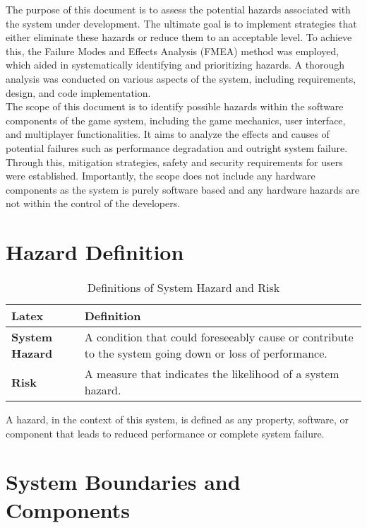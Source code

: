 \documentclass{article}
\begin{document}

The purpose of this document is to assess the potential hazards associated with the system under development. The ultimate goal is to implement strategies that either eliminate these hazards or reduce them to an acceptable level. To achieve this, the Failure Modes and Effects Analysis (FMEA) method was employed, which aided in systematically identifying and prioritizing hazards. A thorough analysis was conducted on various aspects of the system, including requirements, design, and code implementation.\\

The scope of this document is to identify possible hazards within the software components of the game system, including the game mechanics, user interface, and multiplayer functionalities. It aims to analyze the effects and causes of potential failures such as performance degradation and outright system failure. Through this, mitigation strategies, safety and security requirements for users were established. Importantly, the scope does not include any hardware components as the system is purely software based and any hardware hazards are not within the control of the developers.

\section{Hazard Definition}

\begin{table}[H]
    \centering
    \begin{tabular}{|l|p{10cm}|}
    \hline
    \textbf{Latex} & \textbf{Definition} \\ \hline
    \textbf{System Hazard} & A condition that could foreseeably cause or contribute to the system going down or loss of performance. \\ \hline
    \textbf{Risk} & A measure that indicates the likelihood of a system hazard. \\ \hline
    \end{tabular}
    \caption{Definitions of System Hazard and Risk}
\end{table}

A hazard, in the context of this system, is defined as any property, software, or component that leads to reduced performance or complete system failure.


\section{System Boundaries and Components}
\end{document}
